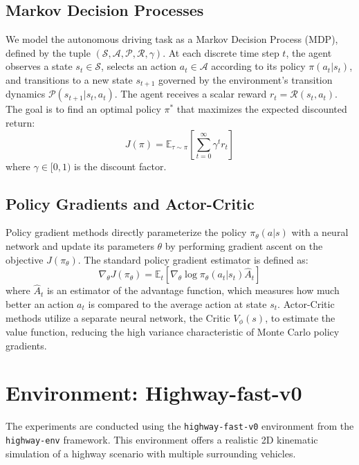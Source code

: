 \documentclass[12pt, a4paper]{article}
\begin{document}
\subsection{Markov Decision Processes}
We model the autonomous driving task as a Markov Decision Process (MDP), defined by the tuple $(\mathcal{S}, \mathcal{A}, \mathcal{P}, \mathcal{R}, \gamma)$. At each discrete time step $t$, the agent observes a state $s_t \in \mathcal{S}$, selects an action $a_t \in \mathcal{A}$ according to its policy $\pi(a_t | s_t)$, and transitions to a new state $s_{t+1}$ governed by the environment's transition dynamics $\mathcal{P}(s_{t+1}|s_t, a_t)$. The agent receives a scalar reward $r_t = \mathcal{R}(s_t, a_t)$. The goal is to find an optimal policy $\pi^*$ that maximizes the expected discounted return:
\begin{equation}
J(\pi) = \mathbb{E}_{\tau \sim \pi} \left[ \sum_{t=0}^{\infty} \gamma^t r_t \right]
\end{equation}
where $\gamma \in [0, 1)$ is the discount factor.

\subsection{Policy Gradients and Actor-Critic}
Policy gradient methods directly parameterize the policy $\pi_\theta(a|s)$ with a neural network and update its parameters $\theta$ by performing gradient ascent on the objective $J(\pi_\theta)$. The standard policy gradient estimator is defined as:
\begin{equation}
\nabla_\theta J(\pi_\theta) = \mathbb{E}_t \left[ \nabla_\theta \log \pi_\theta(a_t|s_t) \hat{A}_t \right]
\end{equation}
where $\hat{A}_t$ is an estimator of the advantage function, which measures how much better an action $a_t$ is compared to the average action at state $s_t$. Actor-Critic methods utilize a separate neural network, the Critic $V_\phi(s)$, to estimate the value function, reducing the high variance characteristic of Monte Carlo policy gradients.

\section{Environment: Highway-fast-v0}
The experiments are conducted using the \texttt{highway-fast-v0} environment from the \texttt{highway-env} framework. This environment offers a realistic 2D kinematic simulation of a highway scenario with multiple surrounding vehicles.
\end{document}
